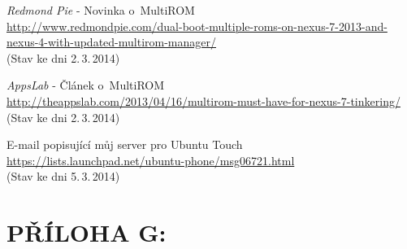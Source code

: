 \documentclass[12pt, a4paper, oneside]{article}
\newcommand{\It}{\textit}  %
\begin{document}
\begin{thebibliography}{99}
     \It{Redmond Pie} - Novinka o~MultiROM\\
    \url{http://www.redmondpie.com/dual-boot-multiple-roms-on-nexus-7-2013-and-nexus-4-with-updated-multirom-manager/}\\
    (Stav ke dni 2.\,3.\,2014)

     \It{AppsLab} - Článek o~MultiROM\\
    \url{http://theappslab.com/2013/04/16/multirom-must-have-for-nexus-7-tinkering/}\\
    (Stav ke dni 2.\,3.\,2014)

     E-mail popisující můj server pro Ubuntu Touch\\
    \url{https://lists.launchpad.net/ubuntu-phone/msg06721.html}\\
    (Stav ke dni 5.\,3.\,2014)

\end{thebibliography}

\newpage
\section*{PŘÍLOHA G:}
~
\listoffigures   %
\end{document}
